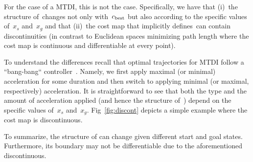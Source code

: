 \documentclass[letterpaper, 10 pt, conference]{ieeeconf}  %
\begin{document}
For the case of a MTDI, this is not the case. 
Specifically, we have that 
(i)~the structure of~\Cinf changes not only with~$c_{\rm best}$ but also according to the specific values of~$x_s$ and~$x_g$ 
and that
(ii)~the cost map that implicitly defines~\Cinf can contain discontinuities (in contrast to Euclidean spaces minimizing path length where the cost map is continuous and differentiable at every point).

To understand the differences recall that optimal trajectories  for MTDI follow a ``bang-bang`` controller~\cite{HN10, KS14}.
Namely, we first apply maximal (or minimal) acceleration for some duration and then switch to applying minimal (or maximal, respectively) acceleration.
It is straightforward to see that both the type and the amount of acceleration applied (and hence the structure of~\Cinf) depend on the specific values of~$x_s$ and~$x_g$. 
Fig~\ref{fig:discont} depicts a simple example where the cost map is discontinuous.

To summarize, the structure of \Cinf can change given different start and goal states.
Furthermore,  its boundary may not be  differentiable due to the aforementioned discontinuous.

\end{document}

